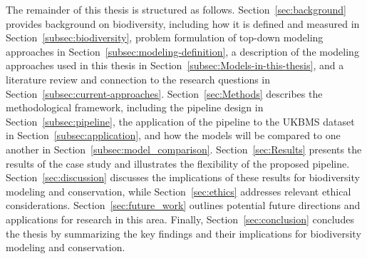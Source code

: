 The remainder of this thesis is structured as follows. Section~\ref{sec:background} provides background on biodiversity, including how it is defined and measured in Section~\ref{subsec:biodiversity}, problem formulation of top-down modeling approaches in Section~\ref{subsec:modeling-definition}, a description of the modeling approaches used in this thesis in Section~\ref{subsec:Models-in-this-thesis}, and a literature review and connection to the research questions in Section~\ref{subsec:current-approaches}. Section~\ref{sec:Methods} describes the methodological framework, including the pipeline design in Section~\ref{subsec:pipeline}, the application of the pipeline to the UKBMS dataset in Section~\ref{subsec:application}, and how the models will be compared to one another in Section~\ref{subsec:model_comparison}. Section~\ref{sec:Results} presents the results of the case study and illustrates the flexibility of the proposed pipeline. Section~\ref{sec:discussion} discusses the implications of these results for biodiversity modeling and conservation, while Section~\ref{sec:ethics} addresses relevant ethical considerations. Section~\ref{sec:future_work} outlines potential future directions and applications for research in this area. Finally, Section~\ref{sec:conclusion} concludes the thesis by summarizing the key findings and their implications for biodiversity modeling and conservation.